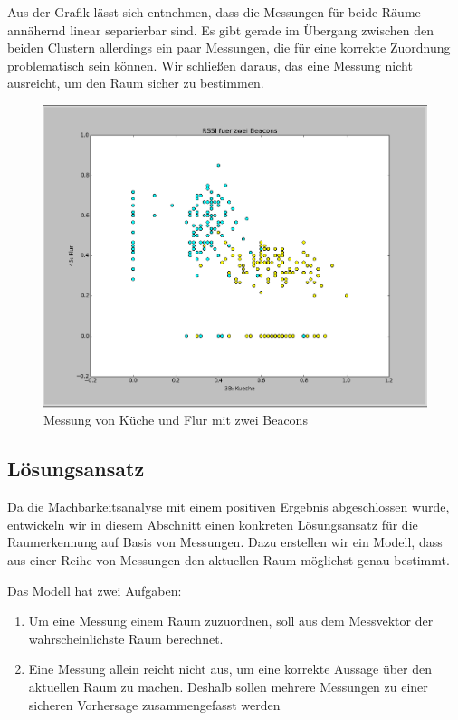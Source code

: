 Aus der Grafik lässt sich entnehmen, dass die Messungen für beide Räume
annähernd linear separierbar sind. Es gibt gerade im Übergang zwischen den beiden
Clustern allerdings ein paar Messungen, die für eine korrekte Zuordnung 
problematisch sein können. Wir schließen daraus, das eine Messung nicht ausreicht,
um den Raum sicher zu bestimmen.

\begin{figure}[tbh]
	\centering
	\includegraphics[width=1.0\linewidth]{Bilder/Messungen/KuecheFlur_1}
	\caption{Messung von Küche und Flur mit zwei Beacons}
	\label{fig:KuecheFlur_1}
\end{figure}

\subsection{Lösungsansatz}

Da die Machbarkeitsanalyse mit einem positiven Ergebnis abgeschlossen wurde,
entwickeln wir in diesem Abschnitt einen konkreten Lösungsansatz für die
Raumerkennung auf Basis von Messungen. Dazu erstellen wir ein Modell, dass aus
einer Reihe von Messungen den aktuellen Raum möglichst genau bestimmt.

Das Modell hat zwei Aufgaben:
\begin{enumerate}
	\item Um eine Messung einem Raum zuzuordnen, soll aus dem Messvektor der
		wahrscheinlichste Raum berechnet.
	\item Eine Messung allein reicht nicht aus, um eine korrekte Aussage über
		den aktuellen Raum zu machen. Deshalb sollen mehrere Messungen zu
		einer sicheren Vorhersage zusammengefasst werden
\end{enumerate}

